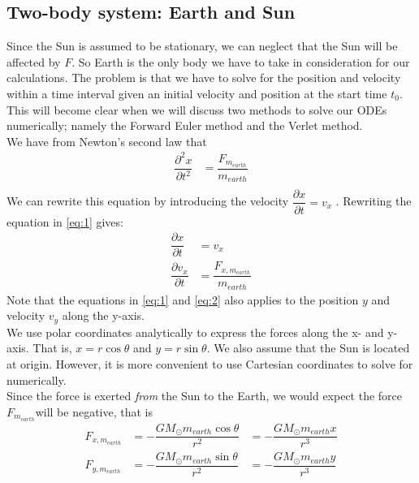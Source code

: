 \documentclass[12pt]{article}
\newcommand{\Ms}{M_\odot}
\begin{document}
	 \subsection{Two-body system: Earth and Sun}\label{subsec:2.1}
	 Since the Sun is assumed to be stationary, we can neglect that the Sun will be affected by $F$. So Earth is the only body we have to take in consideration for our calculations. The problem is that we have to solve for the position and velocity within a time interval given an initial velocity and position at the start time $t_0$. This will become clear when we will discuss two methods to solve our ODEs numerically; namely the Forward Euler method and the Verlet method.\\
	 We have from Newton's second law that
	\begin{equation}\label{eq:1}
	\begin{aligned}
	\dfrac{\partial^2 x}{\partial t^2}&= \dfrac{F_{m_{earth}}}{m_{earth}} \\
	\end{aligned}		
	\end{equation}
	 We can rewrite this equation by introducing the velocity $\dfrac{\partial x}{\partial t} = v_{x}$ . Rewriting the equation in \ref{eq:1} gives: 
	 \begin{equation}\label{eq:2}
	 \begin{aligned}
	 \dfrac{\partial x}{\partial t} &= v_{x} \\ 
	 \dfrac{\partial v_{x}}{\partial t} &= \dfrac{F_{x,m_{earth}}}{m_{earth}} 
	 \end{aligned}
	 \end{equation}
	 Note that the equations in \ref*{eq:1} and \ref*{eq:2} also applies to the position $y$ and velocity $v_y$ along the y-axis. \\ 
	We use polar coordinates analytically to express the forces along the x- and y-axis. That is, $x = r\cos\theta$ and $y = r\sin\theta$. We also assume that the Sun is located at origin. However, it is more convenient to use Cartesian coordinates to solve for numerically. \\
	Since the force is exerted \textit{from} the Sun to the Earth, we would expect the force $F_{m_{earth}}$will be negative, that is 
	\begin{equation*}
	\begin{aligned}
		F_{x,m_{earth}}  &= - \dfrac{G\Ms m_{earth}\cos\theta}{r^2} &=
		- \dfrac{G\Ms m_{earth}x}{r^3} \\
		 F_{y,m_{earth}}  &= - \dfrac{G\Ms m_{earth}\sin\theta}{r^2} &=
		 - \dfrac{G\Ms m_{earth}y}{r^3} 
	\end{aligned}
	\end{equation*}
\end{document}

